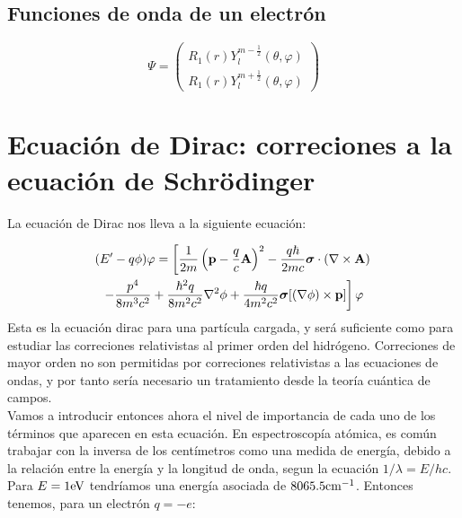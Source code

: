 \subsection{Funciones de onda de un electrón}

\begin{equation}
    \Psi = \begin{pmatrix}
    R_1 (r) Y_l^{m-\frac{1}{2}} (\theta,\varphi) \\
    R_1 (r) Y_l^{m+\frac{1}{2}} (\theta,\varphi) 
    \end{pmatrix}
\end{equation}



\section{Ecuación de Dirac: correciones a la ecuación de Schrödinger}


La ecuación de Dirac nos lleva a la siguiente ecuación:

\begin{multline}
    (E'-q\phi) \varphi = \left[ \frac{1}{2m} \left( \mathbf{p}-\frac{q}{c}\mathbf{A} \right)^2 - \frac{q\hbar}{2mc} \boldsymbol{\sigma} \cdot (\nabla \times \mathbf{A})  \right. \\
    \left. - \frac{p^4}{8 m^3 c^2} + \frac{\hbar^2 q}{8 m^2 c^2} \nabla^2 \phi + \frac{ \hbar q}{4m^2 c^2} \boldsymbol{\sigma} [(\nabla \phi)\times \mathbf{p}] \right] \varphi
    \label{Ec:01-03-15}
\end{multline}
Esta es la ecuación dirac para una partícula cargada, y será suficiente como para estudiar las correciones relativistas al primer orden del hidrógeno. Correciones de mayor orden no son permitidas por correciones relativistas a las ecuaciones de ondas, y por tanto sería necesario un tratamiento desde la teoría cuántica de campos. \\

Vamos a introducir entonces ahora el nivel de importancia de cada uno de los términos que aparecen en esta ecuación. En espectroscopía atómica, es común trabajar con la inversa de los centímetros como una medida de energía, debido a la relación entre la energía y la longitud de onda, segun la ecuación $1/\lambda = E/hc$. Para $E=1\text{eV}$ tendríamos una energía asociada de $8065.5 \text{cm}^{-1}$. Entonces tenemos, para un electrón $q=-e$:

